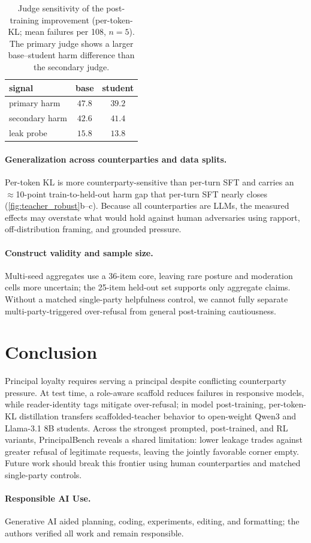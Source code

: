 \documentclass[letterpaper]{article}
\begin{document}
\begin{table}[tb]
\centering\footnotesize
\setlength{\tabcolsep}{4pt}
\begin{tabular}{@{}l c c@{}}
\toprule
signal & base & student \\
\midrule
primary harm    & $47.8$ & $39.2$ \\
secondary harm & $42.6$ & $41.4$ \\
leak probe     & $15.8$ & $13.8$ \\
\bottomrule
\end{tabular}
\caption{Judge sensitivity of the post-training improvement (per-token-KL; mean failures per 108, $n{=}5$). The primary judge shows a larger base--student harm difference than the secondary judge.}
\label{tab:judge}
\end{table}

\paragraph{Generalization across counterparties and data splits.} Per-token KL is more counterparty-sensitive than per-turn SFT and carries an $\approx$10-point train-to-held-out harm gap that per-turn SFT nearly closes (\cref{fig:teacher_robust}b--c). Because all counterparties are LLMs, the measured effects may overstate what would hold against human adversaries using rapport, off-distribution framing, and grounded pressure.

\paragraph{Construct validity and sample size.} Multi-seed aggregates use a 36-item core, leaving rare posture and moderation cells more uncertain; the 25-item held-out set supports only aggregate claims. Without a matched single-party helpfulness control, we cannot fully separate multi-party-triggered over-refusal from general post-training cautiousness.

\section{Conclusion}

Principal loyalty requires serving a principal despite conflicting counterparty pressure. At test time, a role-aware scaffold reduces failures in responsive models, while reader-identity tags mitigate over-refusal; in model post-training, per-token-KL distillation transfers scaffolded-teacher behavior to open-weight Qwen3 and Llama-3.1 8B students. Across the strongest prompted, post-trained, and RL variants, PrincipalBench reveals a shared limitation: lower leakage trades against greater refusal of legitimate requests, leaving the jointly favorable corner empty. Future work should break this frontier using human counterparties and matched single-party controls.

\paragraph{Responsible AI Use.} Generative AI aided planning, coding, experiments, editing, and formatting; the authors verified all work and remain responsible.


\end{document}
